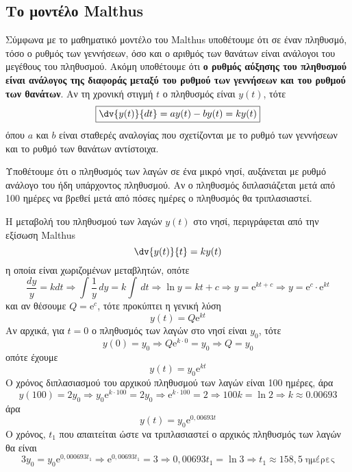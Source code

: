 \subsection*{Το μοντέλο Malthus}


Σύμφωνα με το μαθηματικό μοντέλο του Malthus υποθέτουμε ότι σε έναν πληθυσμό, τόσο ο 
ρυθμός των γεννήσεων, όσο και ο αριθμός των θανάτων είναι ανάλογοι του μεγέθους του 
πληθυσμού. Ακόμη υποθέτουμε ότι \textbf{ο ρυθμός αύξησης του πληθυσμού είναι ανάλογος 
της διαφοράς μεταξύ του ρυθμού των γεννήσεων και του ρυθμού των θανάτων}. 
Αν τη χρονική στιγμή $t$ ο πληθυσμός είναι $ y(t) $, τότε 
\[
  \boxed{  \dv{y(t)}{dt} = ay(t)-by(t) = ky(t) }
\] 
όπου $a$ και $b$ είναι σταθερές αναλογίας που σχετίζονται με το ρυθμό των γεννήσεων και 
το ρυθμό των θανάτων αντίστοιχα.


\begin{problem}
  Υποθέτουμε ότι ο πληθυσμός των λαγών σε ένα μικρό νησί, αυξάνεται με ρυθμό ανάλογο 
  του ήδη υπάρχοντος πληθυσμού. Αν ο πληθυσμός διπλασιάζεται μετά από 100 ημέρες να
  βρεθεί μετά από πόσες ημέρες ο πληθυσμός θα τριπλασιαστεί.
\end{problem}
\begin{solution}
  Η μεταβολή του πληθυσμού των λαγών $ y(t) $ στο νησί, περιγράφεται από την 
  εξίσωση Malthus 
  \[
    \dv{y(t)}{t} = ky(t) 
  \]
  η οποία είναι χωριζομένων μεταβλητών, οπότε
  \[
    \frac{dy}{y} = k dt \Rightarrow \int \frac{1}{y} \,{dy} = k \int \,{dt} \Rightarrow
    \ln{y} = k t + c \Rightarrow y = \mathrm{e}^{kt+c} \Rightarrow y = \mathrm{e}^{c} 
    \cdot \mathrm{e}^{kt}  
  \] 
  και αν θέσουμε $ Q = \mathrm{e}^{c} $, τότε προκύπτει η γενική λύση 
  \[
    y(t) = Q \mathrm{e}^{kt} 
  \]
  Αν αρχικά, για $ t=0 $ ο πληθυσμός των λαγών στο νησί είναι $ y_{0} $, τότε 
  \[
    y(0)= y_{0} \Rightarrow Q \mathrm{e}^{k \cdot 0} = y_{0} \Rightarrow Q = y_{0} 
  \] 
  οπότε έχουμε
  \[
    y(t) = y_{0} \mathrm{e}^{kt} 
  \] 
  Ο χρόνος διπλασιασμού του αρχικού πληθυσμού των λαγών είναι 100 ημέρες, άρα 
  \[
    y(100) = 2 y_{0} \Rightarrow y_{0} \mathrm{e}^{k \cdot 100} = 2 y_{0} \Rightarrow 
    \mathrm{e}^{k \cdot 100} = 2 \Rightarrow 100 k = \ln{2} \Rightarrow k 
    \approx 0.00693 
  \] 
  άρα 
  \[
    y(t) = y_{0} \mathrm{e}^{0,00693t}  
  \] 
  Ο χρόνος, $ t_{1} $ που απαιτείται ώστε να τριπλασιαστεί ο αρχικός πληθυσμός 
  των λαγών θα είναι
  \[
    3 y_{0} = y_{0} \mathrm{e}^{0,000693 t_{1}} \Rightarrow  \mathrm{e}^{0,00693 t_{1}}
    = 3 \Rightarrow 0,00693 t_{1} = \ln{3} \Rightarrow t_{1} \approx 158,5 \;
    \text{ημέρες}
  \] 
\end{solution}

